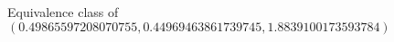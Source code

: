 \documentclass[preview]{standalone}
\begin{document}
\begin{center}
Equivalence class of $(0.49865597208070755, 0.44969463861739745, 1.8839100173593784)$
\end{center}
\end{document}
